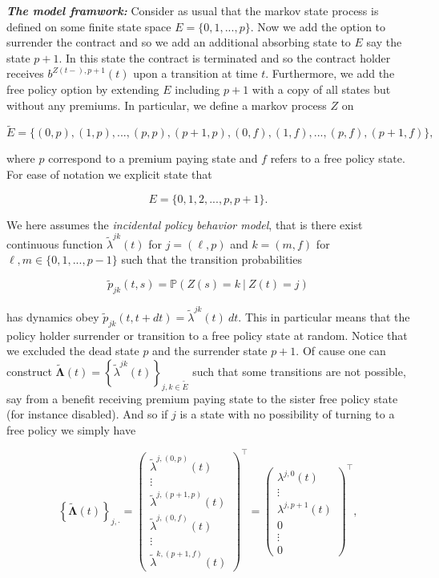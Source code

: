 \documentclass[a4paper,12pt,openany]{book}
\begin{document}
\emph{\textbf{The model framwork:}} Consider as usual that the markov state process is defined on some finite state space \(E=\{0,1,...,p\}\). Now we add the option to surrender the contract and so we add an additional absorbing state to \(E\) say the state \(p+1\). In this state the contract is terminated and so the contract holder receives \(b^{Z(t-),p+1}(t)\) upon a transition at time \(t\). Furthermore, we add the free policy option by extending \(E\) including \(p+1\) with a copy of all states but without any premiums. In particular, we define a markov process \(Z\) on

\[
\widetilde E=\{(0,p),(1,p),...,(p,p),(p+1,p),(0,f),(1,f),...,(p,f),(p+1,f)\},
\]

where \(p\) correspond to a premium paying state and \(f\) refers to a free policy state. For ease of notation we explicit state that

\[
E=\{0,1,2,...,p,p+1\}.
\]

We here assumes the \emph{incidental policy behavior model}, that is there exist continuous function \(\widetilde\lambda^{jk}(t)\) for \(j=(\ell,p)\) and \(k=(m,f)\) for \(\ell, m\in\{0,1,...,p-1\}\) such that the transition probabilities

\[
\widetilde p_{jk}(t,s)=\mathbb P(Z(s)=k\ \vert\ Z(t)=j)
\]

has dynamics obey \(\widetilde p_{jk}(t,t+dt)=\widetilde \lambda^{jk}(t)\ dt\). This in particular means that the policy holder surrender or transition to a free policy state at random. Notice that we excluded the dead state \(p\) and the surrender state \(p+1\). Of cause one can construct \(\widetilde {\mathbf \Lambda}(t)=\left\{\widetilde \lambda^{jk}(t)\right\}_{j,k\in \widetilde E}\) such that some transitions are not possible, say from a benefit receiving premium paying state to the sister free policy state (for instance disabled). And so if \(j\) is a state with no possibility of turning to a free policy we simply have

\[
\left\{\widetilde {\mathbf \Lambda}(t)\right\}_{j,\cdot}=
\begin{pmatrix}
\widetilde\lambda^{j,(0,p)}(t)\\
\vdots\\
\widetilde\lambda^{j,(p+1,p)}(t)\\
\widetilde\lambda^{j,(0,f)}(t)\\
\vdots\\
\widetilde\lambda^{k,(p+1,f)}(t)
\end{pmatrix}^\top=
\begin{pmatrix}
\lambda^{j,0}(t)\\
\vdots\\
\lambda^{j,p+1}(t)\\
0\\
\vdots\\
0
\end{pmatrix}^\top,
\]
\end{document}
